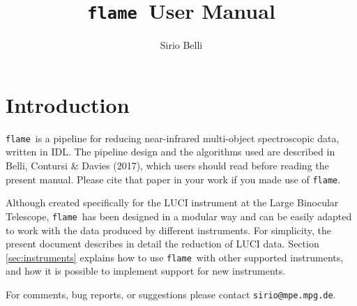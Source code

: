 \documentclass[a4paper]{article}
\newcommand{\flame}{\texttt{flame}}
\begin{document}

\title{\flame\ User Manual}
\author{Sirio Belli}
\maketitle

\newpage
\tableofcontents


\newpage
\section{Introduction}
\label{sec:introduction}

\flame\ is a pipeline for reducing near-infrared multi-object spectroscopic data, written in IDL. The pipeline design and the algorithms used are described in Belli, Contursi \& Davies (2017), which users should read before reading the present manual. Please cite that paper in your work if you made use of \flame.

Although created specifically for the LUCI instrument at the Large Binocular Telescope, \flame\ has been designed in a modular way and can be easily adapted to work with the data produced by different instruments. For simplicity, the present document describes in detail the reduction of LUCI data. Section \ref{sec:instruments} explains how to use \flame\ with other supported instruments, and how it is possible to implement support for new instruments.

For comments, bug reports, or suggestions please contact \texttt{sirio@mpe.mpg.de}.




\end{document}
